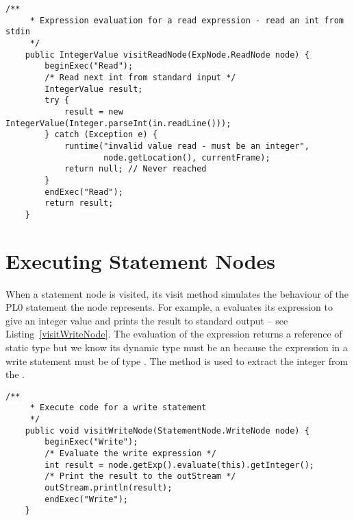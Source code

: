 \documentclass[a4paper,twoside]{article}
\begin{document}
\begin{figure*}[ht]
\begin{lstlisting}[caption=Evaluating a ReadNode,label=visitReadNode]
    /**
     * Expression evaluation for a read expression - read an int from stdin
     */
    public IntegerValue visitReadNode(ExpNode.ReadNode node) {
        beginExec("Read");
        /* Read next int from standard input */
        IntegerValue result;
        try {
            result = new IntegerValue(Integer.parseInt(in.readLine()));
        } catch (Exception e) {
            runtime("invalid value read - must be an integer",
                    node.getLocation(), currentFrame);
            return null; // Never reached
        }
        endExec("Read");
        return result;
    }
\end{lstlisting}
\end{figure*}


\section{Executing Statement Nodes}\label{section:statements}

When a statement node is visited, its visit method simulates the behaviour of the PL0 statement the node represents. 
For example, a  evaluates its expression to give an integer value 
and prints the result to standard output
-- see Listing~\ref{visitWriteNode}.
The evaluation of the expression returns a reference of static type 
but we know its dynamic type must be an 
because the expression in a write statement must be of type .
The method  is used to extract the integer from the .


\begin{figure*}[ht]
\begin{lstlisting}[caption=Interpreting a WriteNode, label=visitWriteNode]
    /**
     * Execute code for a write statement
     */
    public void visitWriteNode(StatementNode.WriteNode node) {
        beginExec("Write");
        /* Evaluate the write expression */
        int result = node.getExp().evaluate(this).getInteger();
        /* Print the result to the outStream */
        outStream.println(result);
        endExec("Write");
    }
\end{lstlisting}
\end{figure*}
\end{document}
